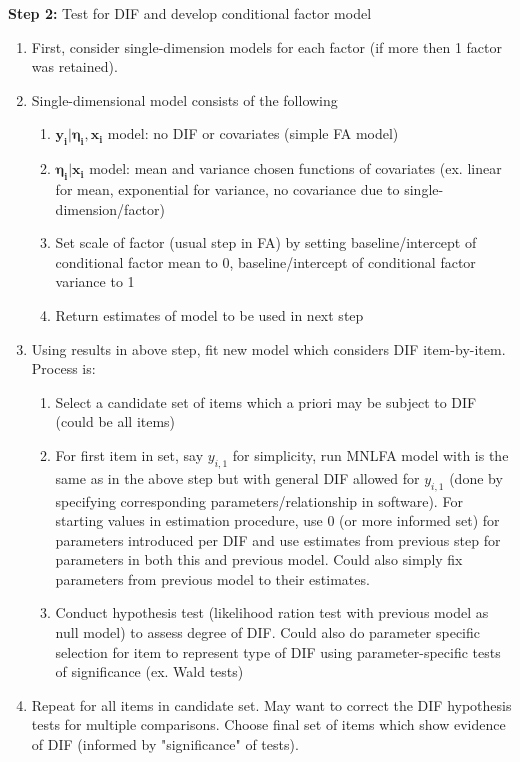 \documentclass[12pt]{article}
\begin{document}
\noindent \textbf{Step 2:} Test for DIF and develop conditional factor model
\begin{enumerate}
\item First, consider single-dimension models for each factor (if more then 1 factor was retained).
\item Single-dimensional model consists of the following
\begin{enumerate}
\item $\boldsymbol{y_i}|\boldsymbol{\eta_i},\boldsymbol{x_i}$ model: no DIF or covariates (simple FA model)
\item $\boldsymbol{\eta_i}|\boldsymbol{x_i}$ model: mean and variance chosen functions of covariates (ex. linear for mean, exponential for variance, no covariance due to single-dimension/factor)
\item Set scale of factor (usual step in FA) by setting baseline/intercept of conditional factor mean to 0, baseline/intercept of conditional factor variance to 1
\item Return estimates of model to be used in next step
\end{enumerate}
\item Using results in above step, fit new model which considers DIF item-by-item.  Process is:
\begin{enumerate}
\item Select a candidate set of items which a priori may be subject to DIF (could be all items)
\item For first item in set, say $y_{i,1}$ for simplicity, run MNLFA model with is the same as in the above step but with general DIF allowed for $y_{i,1}$ (done by specifying corresponding parameters/relationship in software). For starting values in estimation procedure, use 0 (or more informed set) for parameters introduced per DIF and use estimates from previous step for parameters in both this and previous model.  Could also simply fix parameters from previous model to their estimates.
\item Conduct hypothesis test (likelihood ration test with previous model as null model) to assess degree of DIF.  Could also do parameter specific selection for item to represent type of DIF using parameter-specific tests of significance (ex. Wald tests)
\end{enumerate}
\item Repeat for all items in candidate set.  May want to correct the DIF hypothesis tests for multiple comparisons.  Choose final set of items which show evidence of DIF (informed by "significance" of tests).
\end{enumerate}
\end{document}
